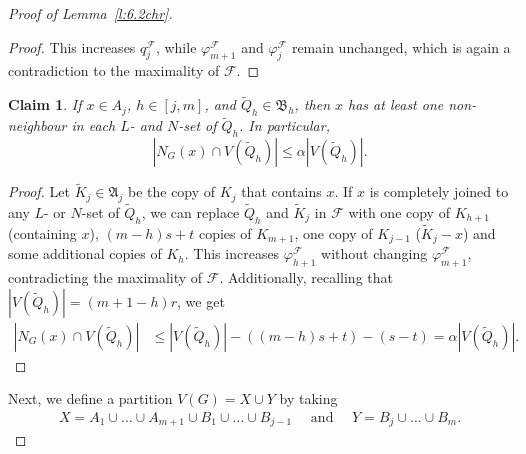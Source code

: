 \documentclass[reqno, 12pt]{amsart}
\numberwithin{equation}{section}
\numberwithin{figure}{section}
\theoremstyle{plain}
\newtheorem{claim}[thm]{Claim}
\theoremstyle{definition}
\let\phi=\varphi
\def\cF{{\mathcal F}}
\def\fA{\mathfrak{A}}
\def\fB{\mathfrak{B}}
\begin{document}
\begin{proof}[Proof of Lemma~\ref{l:6.2chr}]
\begin{proof}
            This increases $q_j^\cF$, while $\phi_{m+1}^\cF$ and $\phi_{j}^\cF$ remain unchanged, which is again a contradiction to the maximality of $\cF$.
        \end{proof}

        \begin{claim}
            \label{c:p-B-non-neighbours-in-L-N}
            If $x\in A_j$, $h\in[j,m]$, and $\tilde Q_h\in \fB_h$, then $x$ has at least one non-neighbour in each $L$- and $N$-set of $\tilde Q_h$. In particular,
            $$|N_G(x)\cap V(\tilde Q_h)|\leq \alpha|V(\tilde Q_h)|.$$
        \end{claim}
        
        \begin{proof}
            Let $\tilde K_j\in \fA_j$ be the copy of $K_j$ that contains $x$. If $x$ is completely joined to any $L$- or $N$-set of $\tilde Q_h$, we can replace $\tilde Q_h$ and $\tilde K_j$ in $\cF$ with one copy of $K_{h+1}$ (containing $x$), $(m-h)s+t$ copies of $K_{m+1}$, one copy of $K_{j-1}$ ($\tilde K_j - x$) and some additional copies of $K_h$. This increases $\phi_{h+1}^\cF$ without changing $\phi_{m+1}^\cF$, contradicting the maximality of $\cF$.
            Additionally, recalling that $|V(\tilde Q_h)|=(m+1-h)r$, we get
            \begin{align*}|N_G(x)\cap V(\tilde Q_h)|&\leq |V(\tilde Q_h)|-((m-h)s+t)-(s-t) = \alpha |V(\tilde Q_h)|.
            \end{align*}
        \end{proof}

        Next, we define a partition $V(G)=X\cup Y$ by taking 
        \begin{align*}X =A_1\cup\dots\cup A_{m+1}\cup B_1\cup \dots \cup B_{j-1} \quad \text{ and } \quad 
        Y = B_j\cup \dots \cup B_m.\end{align*}
        

\end{proof}
\end{document}
